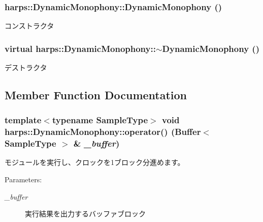 \subsubsection[DynamicMonophony]{\setlength{\rightskip}{0pt plus 5cm}harps::DynamicMonophony::DynamicMonophony ()\hspace{0.3cm}{\tt  [inline]}}\label{classharps_1_1DynamicMonophony_1aa6282a44718f26647c48aa627a80f5}


コンストラクタ 
\subsubsection[$\sim$DynamicMonophony]{\setlength{\rightskip}{0pt plus 5cm}virtual harps::DynamicMonophony::$\sim$DynamicMonophony ()\hspace{0.3cm}{\tt  [inline, virtual]}}\label{classharps_1_1DynamicMonophony_c48c12ff80ee6f9088979fa13509e148}


デストラクタ 

\subsection{Member Function Documentation}
\subsubsection[operator()]{\setlength{\rightskip}{0pt plus 5cm}template$<$typename SampleType$>$ void harps::DynamicMonophony::operator() ({\bf Buffer}$<$ SampleType $>$ \& {\em \_\-buffer})\hspace{0.3cm}{\tt  [inline]}}\label{classharps_1_1DynamicMonophony_034e8a8eb8d8fafd8df36379fb1647dc}


モジュールを実行し、クロックを1ブロック分進めます。 \begin{Desc}
\item[Parameters:]
\begin{description}
\item[{\em \_\-buffer}]実行結果を出力するバッファブロック \end{description}
\end{Desc}
